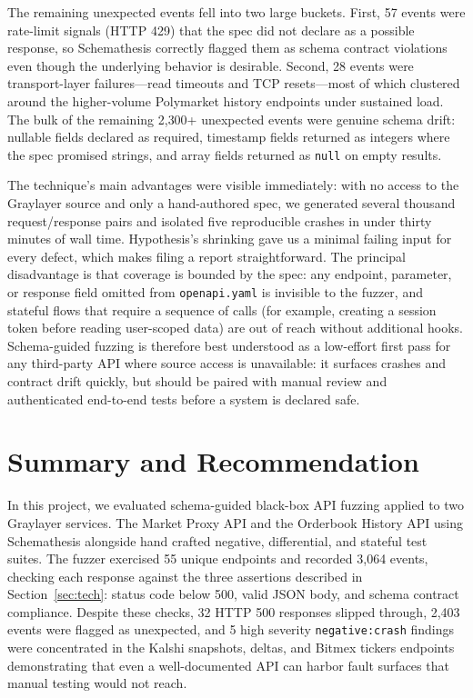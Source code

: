 \documentclass[12pt]{article}
\begin{document}
The remaining unexpected events fell into two large buckets. First,
57 events were rate-limit signals (HTTP 429) that the spec did not
declare as a possible response, so Schemathesis correctly flagged
them as schema contract violations even though the underlying
behavior is desirable. Second, 28 events were transport-layer
failures---read timeouts and TCP resets---most of which clustered
around the higher-volume Polymarket history endpoints under
sustained load. The bulk of the remaining 2{,}300+ unexpected events
were genuine schema drift: nullable fields declared as required,
timestamp fields returned as integers where the spec promised
strings, and array fields returned as \texttt{null} on empty
results.

The technique's main advantages were visible immediately: with no
access to the Graylayer source and only a hand-authored spec, we
generated several thousand request/response pairs and isolated five
reproducible crashes in under thirty minutes of wall time. Hypothesis's
shrinking gave us a minimal failing input for every defect, which
makes filing a report straightforward. The principal disadvantage is
that coverage is bounded by the spec: any endpoint, parameter, or
response field omitted from \texttt{openapi.yaml} is invisible to
the fuzzer, and stateful flows that require a sequence of calls
(for example, creating a session token before reading user-scoped
data) are out of reach without additional hooks. Schema-guided
fuzzing is therefore best understood as a low-effort first pass for
any third-party API where source access is unavailable: it surfaces
crashes and contract drift quickly, but should be paired with manual
review and authenticated end-to-end tests before a system is
declared safe.

\section{Summary and Recommendation}
\author{Akhil Pallem}
\label{sec:summary}

In this project, we evaluated schema-guided black-box API fuzzing applied to two
Graylayer services. The Market Proxy API and the Orderbook History API using
Schemathesis alongside hand crafted negative, differential, and stateful test suites.
The fuzzer exercised 55 unique endpoints and recorded 3,064 events, checking each response against the three assertions described in Section~\ref{sec:tech}: status code
below 500, valid JSON body, and schema contract compliance. Despite these checks,
32 HTTP 500 responses slipped through, 2,403 events were flagged as unexpected, and
5 high severity \texttt{negative:crash} findings were concentrated in the Kalshi
snapshots, deltas, and Bitmex tickers endpoints demonstrating that even a
well-documented API can harbor fault surfaces that manual testing would not reach.
\end{document}

